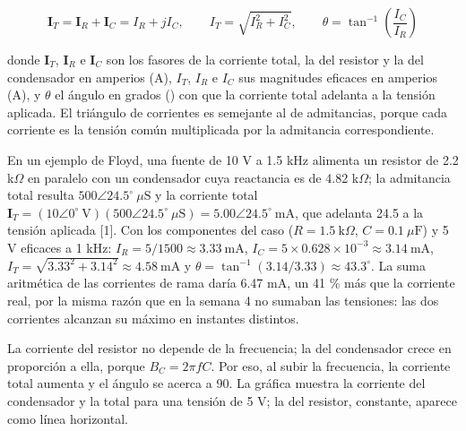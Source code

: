 \documentclass[11pt,letterpaper]{article}
\begin{document}
\begin{equation}
  \mathbf{I}_T = \mathbf{I}_R + \mathbf{I}_C = I_R + jI_C, \qquad I_T = \sqrt{I_R^{2} + I_C^{2}}, \qquad \theta = \tan^{-1}\!\left(\frac{I_C}{I_R}\right)
\end{equation}

donde $\mathbf{I}_T$, $\mathbf{I}_R$ e $\mathbf{I}_C$ son los fasores de la corriente total, la del resistor y la del condensador en amperios (A), $I_T$, $I_R$ e $I_C$ sus magnitudes eficaces en amperios (A), y $\theta$ el ángulo en grados (\textdegree{}) con que la corriente total adelanta a la tensión aplicada. El triángulo de corrientes es semejante al de admitancias, porque cada corriente es la tensión común multiplicada por la admitancia correspondiente.

En un ejemplo de Floyd, una fuente de 10 V a 1.5 kHz alimenta un resistor de 2.2 k\ensuremath{\Omega} en paralelo con un condensador cuya reactancia es de 4.82 k\ensuremath{\Omega}; la admitancia total resulta $500 \angle 24.5^\circ\ \mu\text{S}$ y la corriente total $\mathbf{I}_T = (10 \angle 0^\circ\ \text{V})(500 \angle 24.5^\circ\ \mu\text{S}) = 5.00 \angle 24.5^\circ\ \text{mA}$, que adelanta 24.5\textdegree{} a la tensión aplicada [1]. Con los componentes del caso ($R = 1.5\ \text{k}\Omega$, $C = 0.1\ \mu\text{F}$) y 5 V eficaces a 1 kHz: $I_R = 5/1500 \approx 3.33\ \text{mA}$, $I_C = 5 \times 0.628 \times 10^{-3} \approx 3.14\ \text{mA}$, $I_T = \sqrt{3.33^2 + 3.14^2} \approx 4.58\ \text{mA}$ y $\theta = \tan^{-1}(3.14/3.33) \approx 43.3^\circ$. La suma aritmética de las corrientes de rama daría 6.47 mA, un 41 \% más que la corriente real, por la misma razón que en la semana 4 no sumaban las tensiones: las dos corrientes alcanzan su máximo en instantes distintos.

La corriente del resistor no depende de la frecuencia; la del condensador crece en proporción a ella, porque $B_C = 2\pi f C$. Por eso, al subir la frecuencia, la corriente total aumenta y el ángulo se acerca a 90\textdegree{}. La gráfica muestra la corriente del condensador y la total para una tensión de 5 V; la del resistor, constante, aparece como línea horizontal.
\end{document}
